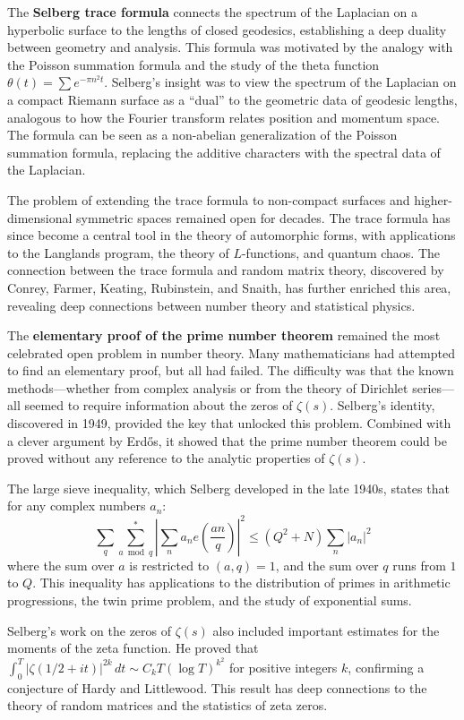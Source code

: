 The \textbf{Selberg trace formula} connects the spectrum of the Laplacian on a hyperbolic surface to the lengths of closed geodesics, establishing a deep duality between geometry and analysis. This formula was motivated by the analogy with the Poisson summation formula and the study of the theta function $\theta(t) = \sum e^{-\pi n^2 t}$. Selberg's insight was to view the spectrum of the Laplacian on a compact Riemann surface as a ``dual'' to the geometric data of geodesic lengths, analogous to how the Fourier transform relates position and momentum space. The formula can be seen as a non-abelian generalization of the Poisson summation formula, replacing the additive characters with the spectral data of the Laplacian.

The problem of extending the trace formula to non-compact surfaces and higher-dimensional symmetric spaces remained open for decades. The trace formula has since become a central tool in the theory of automorphic forms, with applications to the Langlands program, the theory of $L$-functions, and quantum chaos. The connection between the trace formula and random matrix theory, discovered by Conrey, Farmer, Keating, Rubinstein, and Snaith, has further enriched this area, revealing deep connections between number theory and statistical physics.

The \textbf{elementary proof of the prime number theorem} remained the most celebrated open problem in number theory. Many mathematicians had attempted to find an elementary proof, but all had failed. The difficulty was that the known methods---whether from complex analysis or from the theory of Dirichlet series---all seemed to require information about the zeros of $\zeta(s)$. Selberg's identity, discovered in 1949, provided the key that unlocked this problem. Combined with a clever argument by Erd\H{o}s, it showed that the prime number theorem could be proved without any reference to the analytic properties of $\zeta(s)$.

The large sieve inequality, which Selberg developed in the late 1940s, states that for any complex numbers $a_n$:
\[\sum_q \sum_{a \bmod q}^* \left| \sum_n a_n e\left(\frac{an}{q}\right) \right|^2 \leq (Q^2 + N) \sum_n |a_n|^2\]
where the sum over $a$ is restricted to $(a,q)=1$, and the sum over $q$ runs from $1$ to $Q$. This inequality has applications to the distribution of primes in arithmetic progressions, the twin prime problem, and the study of exponential sums.

Selberg's work on the zeros of $\zeta(s)$ also included important estimates for the moments of the zeta function. He proved that $\int_0^T |\zeta(1/2+it)|^{2k} \, dt \sim C_k T (\log T)^{k^2}$ for positive integers $k$, confirming a conjecture of Hardy and Littlewood. This result has deep connections to the theory of random matrices and the statistics of zeta zeros.

